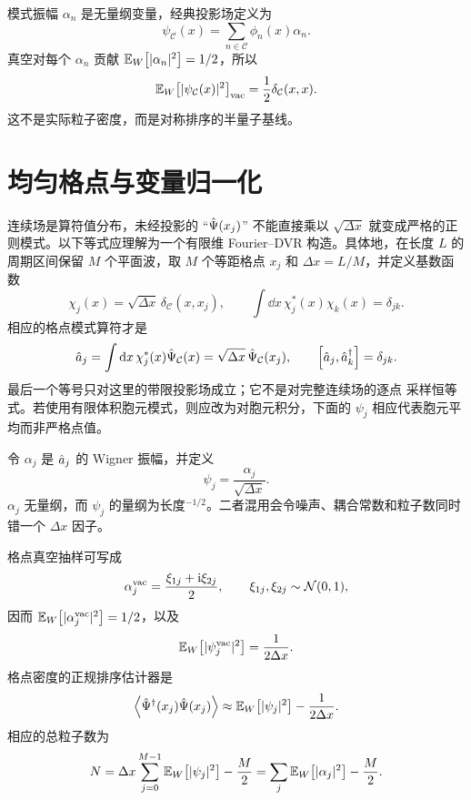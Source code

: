 模式振幅 $\alpha_n$ 是无量纲变量，经典投影场定义为
\begin{equation}
  \psi_{\mathcal C}(x)=\sum_{n\in\mathcal C}\phi_n(x)\alpha_n .
  \label{eq:classical-projected-field}
\end{equation}
真空对每个 $\alpha_n$ 贡献 $\mathbb{E}_{W}\!\left[|\alpha_n|^2\right]=1/2$，所以
\begin{equation}
  \mathbb{E}_{W}\!\left[|\psi_{\mathcal C}(x)|^2\right]_{\rm vac}
  =\frac{1}{2}\delta_{\mathcal C}(x,x).
  \label{eq:projected-vacuum-density}
\end{equation}
这不是实际粒子密度，而是对称排序的半量子基线。

\section{均匀格点与变量归一化}

连续场是算符值分布，未经投影的 ``$\hat{\Psi}(x_j)$'' 不能直接乘以
$\sqrt{\Delta x}$ 就变成严格的正则模式。以下等式应理解为一个有限维
Fourier--DVR 构造。具体地，在长度 $L$ 的周期区间保留 $M$ 个平面波，取
$M$ 个等距格点 $x_j$ 和 $\Delta x=L/M$，并定义基数函数
\begin{equation}
  \chi_j(x)=\sqrt{\Delta x}\,\delta_{\mathcal C}(x,x_j),
  \qquad
  \int\dd x\,\chi_j^*(x)\chi_k(x)=\delta_{jk}.
  \label{eq:grid-cardinal-mode}
\end{equation}
相应的格点模式算符才是
\begin{equation}
  \hat a_j=\int\mathop{}\!\mathrm{d} x\,\chi_j^*(x)\hat{\Psi}_{\mathcal C}(x)
  =\sqrt{\Delta x}\,\hat{\Psi}_{\mathcal C}(x_j),
  \qquad
  \left[\hat a_j,\hat a^{\dagger}_k\right]=\delta_{jk}.
  \label{eq:grid-mode-definition}
\end{equation}
最后一个等号只对这里的带限投影场成立；它不是对完整连续场的逐点
采样恒等式。若使用有限体积胞元模式，则应改为对胞元积分，下面的
$\psi_j$ 相应代表胞元平均而非严格点值。

令 $\alpha_j$ 是 $\hat a_j$ 的 Wigner 振幅，并定义
\begin{equation}
  \psi_j=\frac{\alpha_j}{\sqrt{\Delta x}}.
  \label{eq:grid-field-normalization}
\end{equation}
$\alpha_j$ 无量纲，而 $\psi_j$ 的量纲为长度$^{-1/2}$。二者混用会令噪声、耦合常数和粒子数同时错一个 $\Delta x$ 因子。

格点真空抽样可写成
\begin{equation}
  \alpha_j^{\rm vac}=\frac{\xi_{1j}+\mathrm{i}\xi_{2j}}{2},
  \qquad \xi_{1j},\xi_{2j}\sim\mathcal N(0,1),
  \label{eq:grid-vacuum-sampling}
\end{equation}
因而 $\mathbb{E}_{W}\!\left[|\alpha_j^{\rm vac}|^2\right]=1/2$，以及
\begin{equation}
  \mathbb{E}_{W}\!\left[|\psi_j^{\rm vac}|^2\right]=\frac{1}{2\Delta x}.
  \label{eq:grid-vacuum-density}
\end{equation}
格点密度的正规排序估计器是
\begin{equation}
  \left\langle \hat{\Psi}^{\dagger}(x_j)\hat{\Psi}(x_j)\right\rangle
  \approx \mathbb{E}_{W}\!\left[|\psi_j|^2\right]-\frac{1}{2\Delta x}.
  \label{eq:grid-density-estimator}
\end{equation}
相应的总粒子数为
\begin{equation}
  N=\Delta x\sum_{j=0}^{M-1}\mathbb{E}_{W}\!\left[|\psi_j|^2\right]-\frac{M}{2}
  =\sum_j\mathbb{E}_{W}\!\left[|\alpha_j|^2\right]-\frac{M}{2}.
  \label{eq:grid-total-number}
\end{equation}

